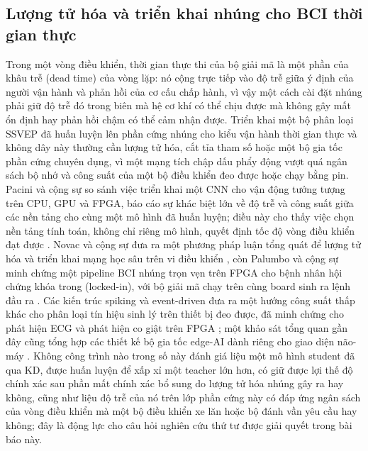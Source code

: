 \documentclass[11pt,a4paper,twoside,asymmetric]{article}
\begin{document}
\subsection{Lượng tử hóa và triển khai nhúng cho BCI thời gian thực}
Trong một vòng điều khiển, thời gian thực thi của bộ giải mã là một phần của khâu trễ (dead time) của vòng lặp: nó cộng trực tiếp vào độ trễ giữa ý định của người vận hành và phản hồi của cơ cấu chấp hành, vì vậy một cách cài đặt nhúng phải giữ độ trễ đó trong biên mà hệ cơ khí có thể chịu được mà không gây mất ổn định hay phản hồi chậm có thể cảm nhận được. Triển khai một bộ phân loại SSVEP đã huấn luyện lên phần cứng nhúng cho kiểu vận hành thời gian thực và không dây này thường cần lượng tử hóa, cắt tỉa tham số hoặc một bộ gia tốc phần cứng chuyên dụng, vì một mạng tích chập dấu phẩy động vượt quá ngân sách bộ nhớ và công suất của một bộ điều khiển đeo được hoặc chạy bằng pin. Pacini và cộng sự so sánh việc triển khai một CNN cho vận động tưởng tượng trên CPU, GPU và FPGA, báo cáo sự khác biệt lớn về độ trễ và công suất giữa các nền tảng cho cùng một mô hình đã huấn luyện; điều này cho thấy việc chọn nền tảng tính toán, không chỉ riêng mô hình, quyết định tốc độ vòng điều khiển đạt được \cite{R60}. Novac và cộng sự đưa ra một phương pháp luận tổng quát để lượng tử hóa và triển khai mạng học sâu trên vi điều khiển \cite{R63}, còn Palumbo và cộng sự minh chứng một pipeline BCI nhúng trọn vẹn trên FPGA cho bệnh nhân hội chứng khóa trong (locked-in), với bộ giải mã chạy trên cùng board sinh ra lệnh đầu ra \cite{R62}. Các kiến trúc spiking và event-driven đưa ra một hướng công suất thấp khác cho phân loại tín hiệu sinh lý trên thiết bị đeo được, đã minh chứng cho phát hiện ECG và phát hiện co giật trên FPGA \cite{R64,R65,R66,R67,R68,R69}; một khảo sát tổng quan gần đây cũng tổng hợp các thiết kế bộ gia tốc edge-AI dành riêng cho giao diện não-máy \cite{R58,R61}. Không công trình nào trong số này đánh giá liệu một mô hình student đã qua KD, được huấn luyện để xấp xỉ một teacher lớn hơn, có giữ được lợi thế độ chính xác sau phần mất chính xác bổ sung do lượng tử hóa nhúng gây ra hay không, cũng như liệu độ trễ của nó trên lớp phần cứng này có đáp ứng ngân sách của vòng điều khiển mà một bộ điều khiển xe lăn hoặc bộ đánh vần yêu cầu hay không; đây là động lực cho câu hỏi nghiên cứu thứ tư được giải quyết trong bài báo này.
\end{document}
